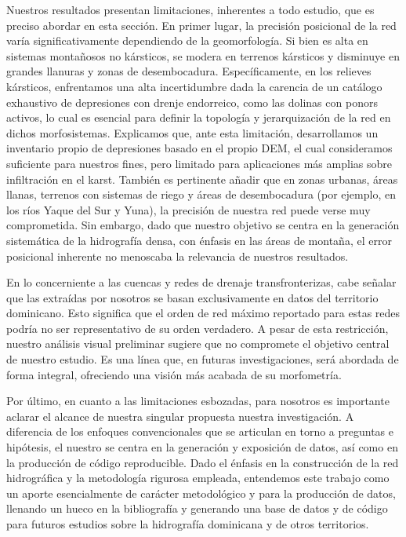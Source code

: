\documentclass[spanish]{article}
\begin{document}
Nuestros resultados presentan limitaciones, inherentes a todo estudio,
que es preciso abordar en esta sección. En primer lugar, la precisión
posicional de la red varía significativamente dependiendo de la
geomorfología. Si bien es alta en sistemas montañosos no kársticos, se
modera en terrenos kársticos y disminuye en grandes llanuras y zonas de
desembocadura. Específicamente, en los relieves kársticos, enfrentamos
una alta incertidumbre dada la carencia de un catálogo exhaustivo de
depresiones con drenje endorreico, como las dolinas con ponors activos,
lo cual es esencial para definir la topología y jerarquización de la red
en dichos morfosistemas. Explicamos que, ante esta limitación,
desarrollamos un inventario propio de depresiones basado en el propio
DEM, el cual consideramos suficiente para nuestros fines, pero limitado
para aplicaciones más amplias sobre infiltración en el karst. También es
pertinente añadir que en zonas urbanas, áreas llanas, terrenos con
sistemas de riego y áreas de desembocadura (por ejemplo, en los ríos
Yaque del Sur y Yuna), la precisión de nuestra red puede verse muy
comprometida. Sin embargo, dado que nuestro objetivo se centra en la
generación sistemática de la hidrografía densa, con énfasis en las áreas
de montaña, el error posicional inherente no menoscaba la relevancia de
nuestros resultados.

En lo concerniente a las cuencas y redes de drenaje transfronterizas,
cabe señalar que las extraídas por nosotros se basan exclusivamente en
datos del territorio dominicano. Esto significa que el orden de red
máximo reportado para estas redes podría no ser representativo de su
orden verdadero. A pesar de esta restricción, nuestro análisis visual
preliminar sugiere que no compromete el objetivo central de nuestro
estudio. Es una línea que, en futuras investigaciones, será abordada de
forma integral, ofreciendo una visión más acabada de su morfometría.

Por último, en cuanto a las limitaciones esbozadas, para nosotros es
importante aclarar el alcance de nuestra singular propuesta nuestra
investigación. A diferencia de los enfoques convencionales que se
articulan en torno a preguntas e hipótesis, el nuestro se centra en la
generación y exposición de datos, así como en la producción de código
reproducible. Dado el énfasis en la construcción de la red hidrográfica
y la metodología rigurosa empleada, entendemos este trabajo como un
aporte esencialmente de carácter metodológico y para la producción de
datos, llenando un hueco en la bibliografía y generando una base de
datos y de código para futuros estudios sobre la hidrografía dominicana
y de otros territorios.
\end{document}
